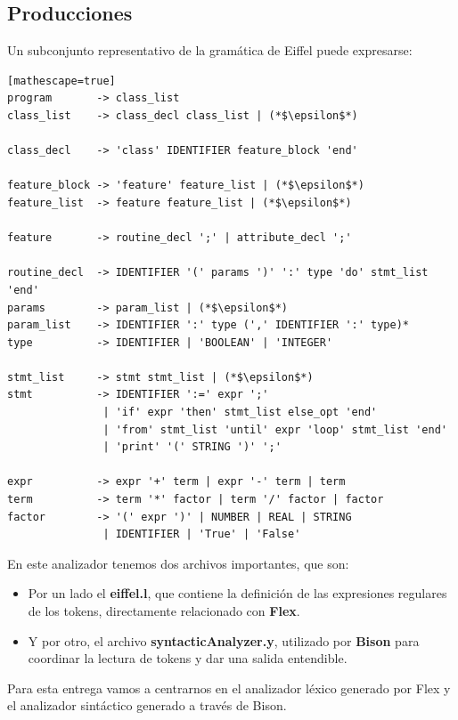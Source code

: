 \documentclass[a4paper,12pt]{article}
\begin{document}
\subsection{Producciones}
Un subconjunto representativo de la gramática de Eiffel puede expresarse:

\begin{lstlisting}[language={}][mathescape=true]
program       -> class_list
class_list    -> class_decl class_list | (*$\epsilon$*)

class_decl    -> 'class' IDENTIFIER feature_block 'end'

feature_block -> 'feature' feature_list | (*$\epsilon$*)
feature_list  -> feature feature_list | (*$\epsilon$*)

feature       -> routine_decl ';' | attribute_decl ';'

routine_decl  -> IDENTIFIER '(' params ')' ':' type 'do' stmt_list 'end'
params        -> param_list | (*$\epsilon$*)
param_list    -> IDENTIFIER ':' type (',' IDENTIFIER ':' type)*
type          -> IDENTIFIER | 'BOOLEAN' | 'INTEGER'

stmt_list     -> stmt stmt_list | (*$\epsilon$*)
stmt          -> IDENTIFIER ':=' expr ';'
               | 'if' expr 'then' stmt_list else_opt 'end'
               | 'from' stmt_list 'until' expr 'loop' stmt_list 'end'
               | 'print' '(' STRING ')' ';'

expr          -> expr '+' term | expr '-' term | term
term          -> term '*' factor | term '/' factor | factor
factor        -> '(' expr ')' | NUMBER | REAL | STRING
               | IDENTIFIER | 'True' | 'False'
\end{lstlisting}


En este analizador tenemos dos archivos importantes, que son:

\begin{itemize}
    \item Por un lado el \textbf{eiffel.l}, que contiene la definición de
          las
          expresiones regulares de los tokens, directamente relacionado con
          \textbf{Flex}.
    \item Y por otro, el archivo \textbf{syntacticAnalyzer.y}, utilizado
          por
          \textbf{Bison} para coordinar la lectura de tokens y dar una
          salida entendible.
\end{itemize}

\noindent
Para esta entrega vamos a centrarnos en el analizador léxico generado por Flex y el analizador sintáctico generado a través de Bison.
\end{document}

